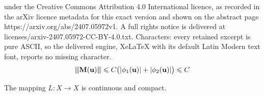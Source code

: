 \documentclass[10pt,a4paper]{amsart}
\newcommand{\bM}{\mathbf{M}}
\newcommand{\bu}{\mathbf{u}}
\newcommand{\vertiii}[1]{{\left\vert\kern-0.25ex\left\vert\kern-0.25ex\left\vert #1 
    \right\vert\kern-0.25ex\right\vert\kern-0.25ex\right\vert}}
\renewcommand{\leq}{\leqslant}
\begin{document}
under the Creative Commons Attribution 4.0 International licence, as recorded in the arXiv licence metadata for this exact version and shown on the abstract page https://arxiv.org/abs/2407.05972v1. A full rights notice is delivered at licenses/arxiv-2407.05972-CC-BY-4.0.txt. Characters: every retained excerpt is pure ASCII, so the delivered engine, XeLaTeX with its default Latin Modern text font, reports no missing character.
\begin{equation}\label{eq:op norm of auxiliary M}
    \vertiii{\bM(\bu)} \leq C \big( |\phi_1(\bu)| + |\phi_2(\bu)| \big) \leq C 
\end{equation}

\begin{lemma}\label{lem:fixed pt i}
    The mapping $L : X \to X$ is continuous and compact.
\end{lemma}
\end{document}
